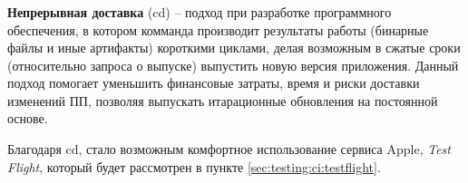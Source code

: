 \subsubsection{}
\label{sec:testing:ci:cd}

\textbf{Непрерывная доставка} (\gls{cd}) -- подход при разработке программного обеспечения, в котором комманда производит результаты работы (бинарные файлы и иные артифакты) короткими циклами, делая возможным в сжатые сроки (относительно запроса о выпуске) выпустить новую версия приложения. Данный подход помогает уменьшить финансовые затраты, время и риски доставки изменений ПП, позволяя выпускать итарационные обновления на постоянной основе.

Благодаря \gls{cd}, стало возможным комфортное использование сервиса Apple, \textit{Test Flight}, который будет рассмотрен в пункте \ref{sec:testing:ci:testflight}.